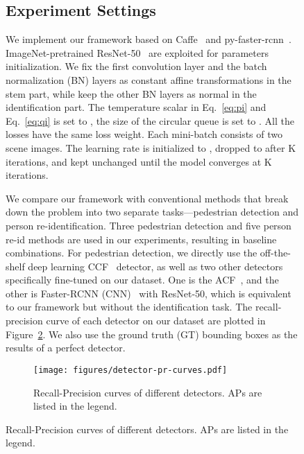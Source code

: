 \documentclass[10pt,twocolumn,letterpaper]{article}
\begin{document}
\begin{figure}[t]
\begin{center}
\subsection{Experiment Settings} \label{sub:experiment_settings}
We implement our framework based on Caffe~\cite{jia2014caffe,wang2016temporal} and py-faster-rcnn~\cite{girshick2015fast,ren2015faster}. ImageNet-pretrained ResNet-50~\cite{he2015deep} are exploited for parameters initialization. We fix the first  convolution layer and the batch normalization (BN) layers as constant affine transformations in the stem part, while keep the other BN layers as normal in the identification part. The temperature scalar  in Eq.~\eqref{eq:pi} and Eq.~\eqref{eq:qi} is set to , the size of the circular queue is set to . All the losses have the same loss weight. Each mini-batch consists of two scene images. The learning rate is initialized to , dropped to  after K iterations, and kept unchanged until the model converges at K iterations.

We compare our framework with conventional methods that break down the problem into two separate tasks---pedestrian detection and person re-identification. Three pedestrian detection and five person re-id methods are used in our experiments, resulting in  baseline combinations. For pedestrian detection, we directly use the off-the-shelf deep learning CCF~\cite{yang2015convolutional} detector, as well as two other detectors specifically fine-tuned on our dataset. One is the ACF~\cite{dollar2014fast}, and the other is Faster-RCNN (CNN)~\cite{ren2015faster} with ResNet-50, which is equivalent to our framework but without the identification task. The recall-precision curve of each detector on our dataset are plotted in Figure~\ref{fig:detector-pr-curves}. We also use the ground truth (GT) bounding boxes as the results of a perfect detector.
\begin{figure}[t]
\begin{center}
\texttt{[image: figures/detector-pr-curves.pdf]}
\end{center}
\vspace{-4ex}
\caption{Recall-Precision curves of different detectors. APs are listed in the legend.}
\label{fig:detector-pr-curves}
\end{figure}


\end{center}
\end{figure}
\end{document}
